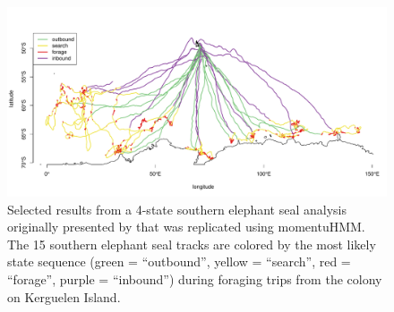 \documentclass[12pt]{article}\usepackage[]{graphicx}\usepackage[]{color}
\begin{document}
\begin{figure}[htbp]
  \centering
  \includegraphics[width=\textwidth]{plot_sesResults2}
  \caption{Selected results from a 4-state southern elephant seal analysis originally presented by \cite{MichelotEtAl2017} that was replicated using momentuHMM. The 15 southern elephant seal tracks are colored by the most likely state sequence (green = ``outbound'', yellow = ``search'', red = ``forage'', purple = ``inbound'') during foraging trips from the colony on Kerguelen Island.}
  \label{fig:sesTracks}
\end{figure}
\end{document}
